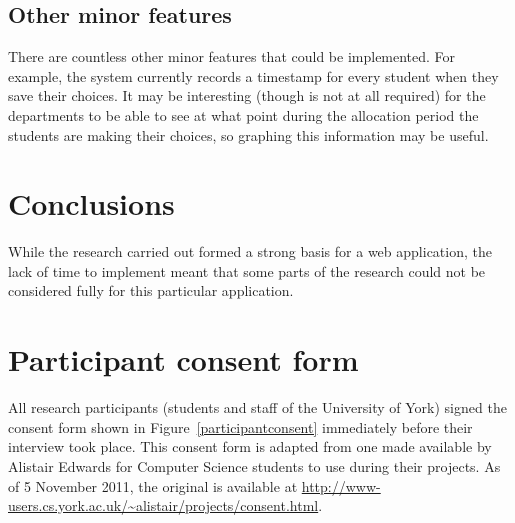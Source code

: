 \documentclass[draft]{scrartcl}
\let\stdsection\section
\renewcommand\section{\clearpage\stdsection}
\begin{document}
\subsection{Other minor features}

There are countless other minor features that could be implemented. For
example, the system currently records a timestamp for every student when they
save their choices. It may be interesting (though is not at all required) for
the departments to be able to see at what point during the allocation period
the students are making their choices, so graphing this information may be
useful.

\section{Conclusions}
\label{sec:conclusions}





While the research carried out formed a strong basis for a web application,
the lack of time to implement meant that some parts of the research could not
be considered fully for this particular application.

\clearpage
\appendix

\stdsection{Participant consent form}
\label{sec:consent}

All research participants (students and staff of the University of York)
signed the consent form shown in Figure~\ref{participantconsent} immediately
before their interview took place. This consent form is adapted from one made
available by Alistair Edwards for Computer Science students to use during
their projects. As of 5 November 2011, the original is available at
\url{http://www-users.cs.york.ac.uk/~alistair/projects/consent.html}.
\end{document}
